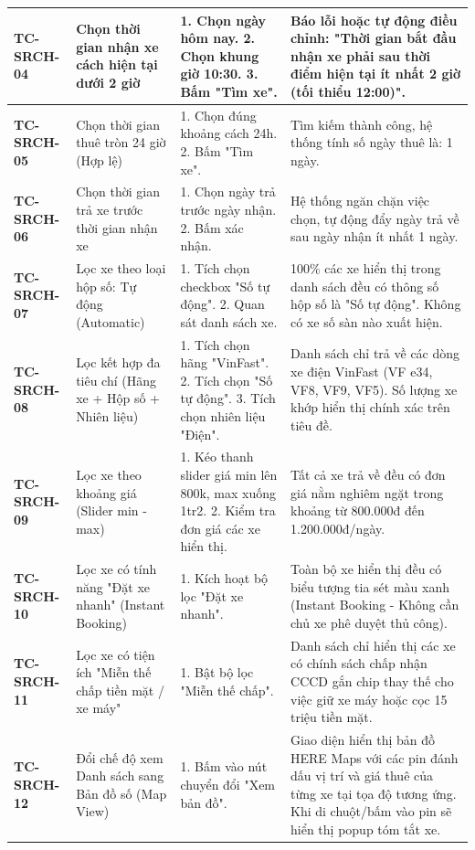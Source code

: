 {\begin{longtable}{p{2.3cm}p{3.8cm}p{4.8cm}p{4.2cm}}
\textbf{TC-SRCH-04} & Chọn thời gian nhận xe cách hiện tại dưới 2 giờ & 1. Chọn ngày hôm nay. 2. Chọn khung giờ 10:30. 3. Bấm "Tìm xe". & Báo lỗi hoặc tự động điều chỉnh: "Thời gian bắt đầu nhận xe phải sau thời điểm hiện tại ít nhất 2 giờ (tối thiểu 12:00)". \\ \midrule
\textbf{TC-SRCH-05} & Chọn thời gian thuê tròn 24 giờ (Hợp lệ) & 1. Chọn đúng khoảng cách 24h. 2. Bấm "Tìm xe". & Tìm kiếm thành công, hệ thống tính số ngày thuê là: 1 ngày. \\ \midrule
\textbf{TC-SRCH-06} & Chọn thời gian trả xe trước thời gian nhận xe & 1. Chọn ngày trả trước ngày nhận. 2. Bấm xác nhận. & Hệ thống ngăn chặn việc chọn, tự động đẩy ngày trả về sau ngày nhận ít nhất 1 ngày. \\ \midrule
\textbf{TC-SRCH-07} & Lọc xe theo loại hộp số: Tự động (Automatic) & 1. Tích chọn checkbox "Số tự động". 2. Quan sát danh sách xe. & 100\% các xe hiển thị trong danh sách đều có thông số hộp số là "Số tự động". Không có xe số sàn nào xuất hiện. \\ \midrule
\textbf{TC-SRCH-08} & Lọc kết hợp đa tiêu chí (Hãng xe + Hộp số + Nhiên liệu) & 1. Tích chọn hãng "VinFast". 2. Tích chọn "Số tự động". 3. Tích chọn nhiên liệu "Điện". & Danh sách chỉ trả về các dòng xe điện VinFast (VF e34, VF8, VF9, VF5). Số lượng xe khớp hiển thị chính xác trên tiêu đề. \\ \midrule
\textbf{TC-SRCH-09} & Lọc xe theo khoảng giá (Slider min - max) & 1. Kéo thanh slider giá min lên 800k, max xuống 1tr2. 2. Kiểm tra đơn giá các xe hiển thị. & Tất cả xe trả về đều có đơn giá nằm nghiêm ngặt trong khoảng từ 800.000đ đến 1.200.000đ/ngày. \\ \midrule
\textbf{TC-SRCH-10} & Lọc xe có tính năng "Đặt xe nhanh" (Instant Booking) & 1. Kích hoạt bộ lọc "Đặt xe nhanh". & Toàn bộ xe hiển thị đều có biểu tượng tia sét màu xanh (Instant Booking - Không cần chủ xe phê duyệt thủ công). \\ \midrule
\textbf{TC-SRCH-11} & Lọc xe có tiện ích "Miễn thế chấp tiền mặt / xe máy" & 1. Bật bộ lọc "Miễn thế chấp". & Danh sách chỉ hiển thị các xe có chính sách chấp nhận CCCD gắn chip thay thế cho việc giữ xe máy hoặc cọc 15 triệu tiền mặt. \\ \midrule
\textbf{TC-SRCH-12} & Đổi chế độ xem Danh sách sang Bản đồ số (Map View) & 1. Bấm vào nút chuyển đổi "Xem bản đồ". & Giao diện hiển thị bản đồ HERE Maps với các pin đánh dấu vị trí và giá thuê của từng xe tại tọa độ tương ứng. Khi di chuột/bấm vào pin sẽ hiển thị popup tóm tắt xe. \\ \midrule

\end{longtable}}
